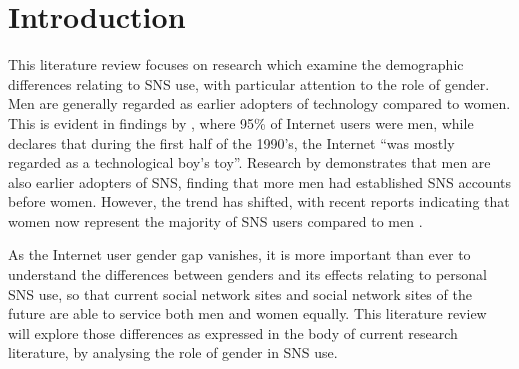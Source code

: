 \section{Introduction}


This literature review focuses on research which examine the demographic differences relating to SNS use, with particular attention to the role of gender. Men are generally regarded as earlier adopters of technology compared to women. This is evident in findings by \citet{Pitkow1994}, where 95\% of Internet users were men, while \citet[p. 896]{Kimbrough2013} declares that during the first half of the 1990's, the Internet ``was mostly regarded as a technological boy's toy''. Research by \citet{Fogel2009} demonstrates that men are also earlier adopters of SNS, finding that more men had established SNS accounts before women. However, the trend has shifted, with recent reports indicating that women now represent the majority of SNS users compared to men \citep{Duggan2013, Hampton2011}.

As the Internet user gender gap vanishes, it is more important than ever to understand the differences between genders and its effects relating to personal SNS use, so that current social network sites and social network sites of the future are able to service both men and women equally. This literature review will explore those differences as expressed in the body of current research literature, by analysing the role of gender in SNS use.